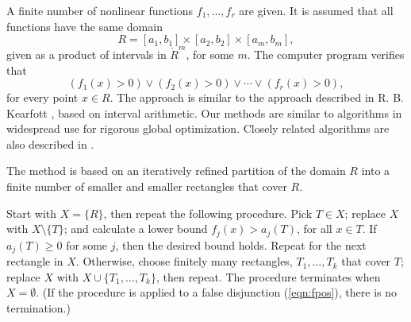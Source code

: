 \documentclass{article} %
\begin{document}
A finite number of nonlinear functions $f_1,\ldots,f_r$ are given.
It is assumed that all functions have the same domain
   $$R= [a_1,b_1] \times [a_2,b_2] \times [a_m,b_m],$$
given as a product of intervals in $\ring{R}^m$, for some $m$.
The computer program verifies that
  \begin{equation}\label{eqn:fpos}
  (f_1(x) >0) \lor (f_2(x) >0) \lor \cdots \lor (f_r(x) >0),
  \end{equation}
for every point $x\in R$.
The approach is similar to the approach described in
R. B. Kearfott \cite{Kea96}, based on interval arithmetic.
Our methods are similar to algorithms in widespread use for
rigorous global optimization.  Closely related algorithms
are also described in \cite{Zu}.

The method is based on an iteratively refined 
partition of the domain  $R$
into a finite number of smaller and smaller rectangles that cover $R$.

Start with $X=\{R\}$,  then repeat the following procedure.
Pick $T\in X$; replace $X$ with $X\setminus\{T\}$; and
calculate a lower bound $f_j(x) > a_j(T)$, 
for all $x\in T$.  If $a_j(T)\ge 0$ for some $j$, then
the desired bound holds.  Repeat for the next rectangle in $X$.
Otherwise, choose finitely many rectangles, $T_1,\ldots,T_k$ that cover $T$;
replace $X$ with $X\cup\{T_1,\ldots,T_k\}$, then repeat.
The procedure terminates when $X=\emptyset$.  (If the procedure
is applied to a false disjunction (\ref{eqn:fpos}), there is no
termination.)


\end{document}
